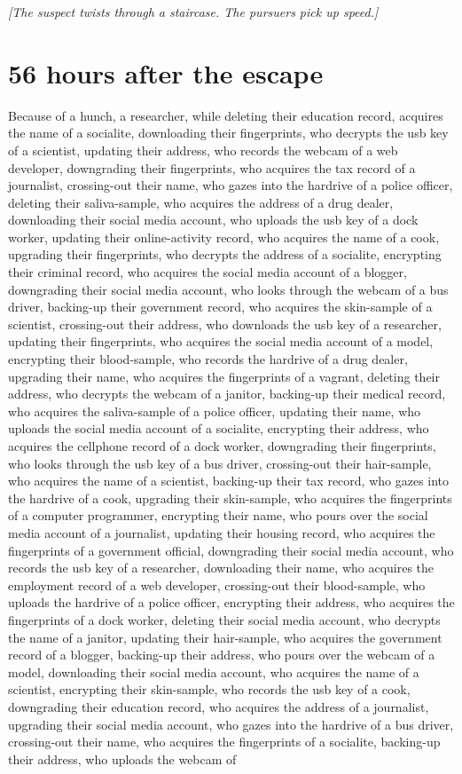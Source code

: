\documentclass{report}
\begin{document}
\textit{[The suspect twists through a staircase. The pursuers pick up speed.]}


\section*{56 \small{hours after the escape}}

Because of a hunch, a researcher, while deleting their education record, acquires the name of a socialite, downloading their fingerprints, who decrypts the usb key of a scientist, updating their address, who records the webcam of a web developer, downgrading their fingerprints, who acquires the tax record of a journalist, crossing-out their name, who gazes into the hardrive of a police officer, deleting their saliva-sample, who acquires the address of a drug dealer, downloading their social media account, who uploads the usb key of a dock worker, updating their online-activity record, who acquires the name of a cook, upgrading their fingerprints, who decrypts the address of a socialite, encrypting their criminal record, who acquires the social media account of a blogger, downgrading their social media account, who looks through the webcam of a bus driver, backing-up their government record, who acquires the skin-sample of a scientist, crossing-out their address, who downloads the usb key of a researcher, updating their fingerprints, who acquires the social media account of a model, encrypting their blood-sample, who records the hardrive of a drug dealer, upgrading their name, who acquires the fingerprints of a vagrant, deleting their address, who decrypts the webcam of a janitor, backing-up their medical record, who acquires the saliva-sample of a police officer, updating their name, who uploads the social media account of a socialite, encrypting their address, who acquires the cellphone record of a dock worker, downgrading their fingerprints, who looks through the usb key of a bus driver, crossing-out their hair-sample, who acquires the name of a scientist, backing-up their tax record, who gazes into the hardrive of a cook, upgrading their skin-sample, who acquires the fingerprints of a computer programmer, encrypting their name, who pours over the social media account of a journalist, updating their housing record, who acquires the fingerprints of a government official, downgrading their social media account, who records the usb key of a researcher, downloading their name, who acquires the employment record of a web developer, crossing-out their blood-sample, who uploads the hardrive of a police officer, encrypting their address, who acquires the fingerprints of a dock worker, deleting their social media account, who decrypts the name of a janitor, updating their hair-sample, who acquires the government record of a blogger, backing-up their address, who pours over the webcam of a model, downloading their social media account, who acquires the name of a scientist, encrypting their skin-sample, who records the usb key of a cook, downgrading their education record, who acquires the address of a journalist, upgrading their social media account, who gazes into the hardrive of a bus driver, crossing-out their name, who acquires the fingerprints of a socialite, backing-up their address, who uploads the webcam of 
\end{document}
